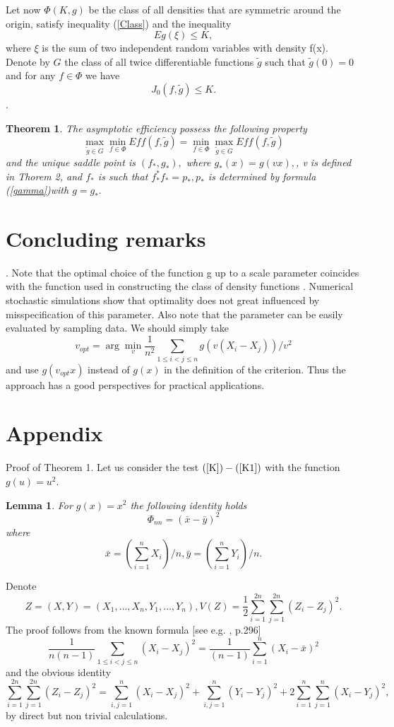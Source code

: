 \documentclass[final,11pt,3p]{elsarticle}
\newtheorem{theorem}{Theorem}
\newtheorem{lemma}{Lemma}
\begin{document}
Let now $\Phi(K,g)$  be the class of all densities that are symmetric around the origin, satisfy inequality (\ref{Class}) and the inequality
$$
Eg(\xi) \leq K,
$$
where $\xi$ is the sum of two independent random variables with density f(x). 
Denote by $G$ the class of all twice differentiable functions $\tilde g$ such that $\tilde g(0)=0$ and for any $f \in \Phi$ we have 
$$ 
J_0(f,\tilde g) \leq K.
$$.
\begin{theorem}
The asymptotic efficiency possess the following property
\begin{equation}\label{minmax}
\max_{\tilde g \in G} \min_{f \in \Phi} Eff(f,\tilde g)=\min_{f \in \Phi}
\max_{\tilde g \in G}Eff(f,\tilde g)
\end{equation}
and the unique saddle point is $(f_{*},g_{*}),$ where 
$g_{*}(x)= g(vx),$, v is defined in Thorem 2, and $f_{*}$ is such that $f_{*}^*f_{*}= p_{*}, p_{*}$ is determined by formula (\ref{gamma})with $g=g_{*}.$
\end{theorem}
\section{Concluding remarks}.
Note that the optimal choice of the function g up to a scale parameter coincides with the function used in constructing the class of density functions . Numerical stochastic simulations show that optimality does not great influenced by misspecification of this parameter. Also note that the parameter can be easily evaluated by sampling data.
We should simply take
$$
v_{opt}= \arg \min_v \frac{1}{n^2}\sum_{1\leq i<j\leq n} g(v(X_i-X_j))/v^2
$$
and use  $g(v_{opt} x)$ instead of $g(x)$ in the definition of the criterion.
Thus the approach has a good perspectives for practical applications.


      \section{Appendix}
Proof of Theorem 1.
Let us consider the test $(\ref{K})-(\ref{K1})$ with the function $g(u)=u^2$. 

\begin{lemma} For $g(x)= x^2$ the following identity holds
$$
\Phi_{nn}= (\bar x - \bar y)^2
$$
where
$$
\bar x = (\sum_{i=1}^n X_i)/n,
\bar y = (\sum_{i=1}^n Y_i)/n.
$$
\end{lemma}
Denote
$$ 
 Z=(X,Y)= (X_1,\dots, X_n,Y_1,\dots, Y_n),
V(Z)=\frac{1}{2}\sum_{i=1}^{2n}\sum_{j=1}^{2n} (Z_i-Z_j)^2.
$$
The proof follows from the known formula [see e.g. \cite{Hoeffding}, p.296]
\begin{equation}\label{step1} 
\frac {1}{n(n-1)}\sum_{1\leq i<j\leq n
} (X_i-X_j)^2=\frac {1}{(n-1)} \sum_{i=1}^n (X_i - \bar x)^2
\end{equation}
and the obvious identity
\begin{equation}\label{step2}
\sum_{i=1}^{2n}\sum_{j=1}^{2n} (Z_i-Z_j)^2=\sum_{i,j=1}^n(X_i-X_j)^2+
\sum_{i,j=1}^n (Y_i-Y_j)^2+2\sum_{i=1}^n\sum_{j=1}^n (X_i-Y_j)^2,
\end{equation}
by  direct but non trivial  calculations. 
\end{document}
